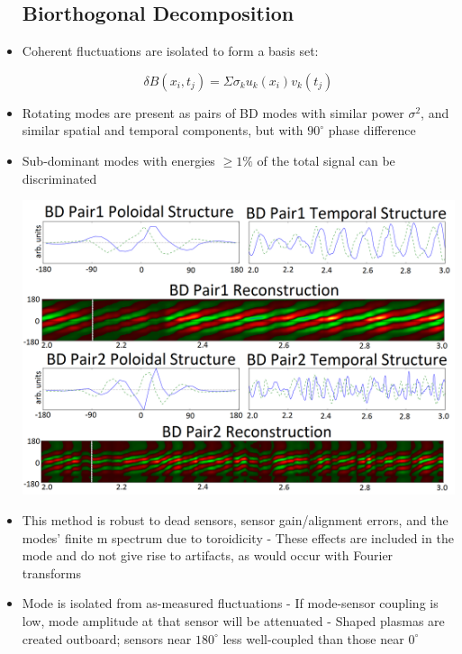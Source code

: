 \documentclass{article}
\begin{document}
\begin{multicols}{5}
\begin{itemize}
\subsection{Biorthogonal Decomposition}
\item Coherent fluctuations are isolated to form a basis set:
\begin{Large}
\begin{equation}
\delta B(x_i,t_j) = \Sigma \sigma_k u_k(x_i) v_k(t_j)
\end{equation}
\end{Large}
\newline
\item Rotating modes are present as pairs of BD modes with similar power $\sigma^2$, and similar spatial and temporal components, but with $90^{\circ} $ phase difference\\
\item Sub-dominant modes with energies $\geq 1\%$ of the total signal can be discriminated
\begin{center}

\includegraphics[width=1\columnwidth]{85402_bd_reconstructions.png}\\

\end{center}
\item This method is robust to dead sensors, sensor gain/alignment errors, and the modes' finite m spectrum due to toroidicity
\subitem - These effects are included in the mode and do not give rise to artifacts, as would occur with Fourier transforms
\item Mode is isolated from as-measured fluctuations
\subitem - If mode-sensor coupling is low, mode amplitude at that sensor will be attenuated
\subitem - Shaped plasmas are created outboard; sensors near $180^{\circ}$ less well-coupled than those near $0^{\circ}$\\



\end{itemize}
\end{multicols}
\end{document}

